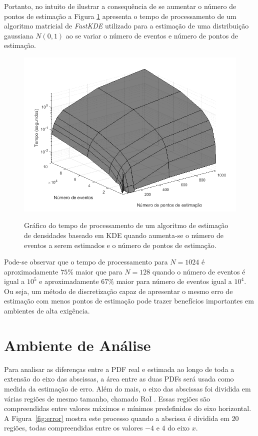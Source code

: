 Portanto, no intuito de ilustrar a consequência de se aumentar o número de pontos de estimação a Figura \ref{fig:compKDE} apresenta o tempo de processamento de um algoritmo matricial de \textit{FastKDE} utilizado para a estimação de uma distribuição gaussiana $N(0,1)$ ao se variar o número de eventos e número de pontos de estimação.

\begin{figure}[!ht]
	\centering
	\includegraphics[width=0.8\linewidth]{./figuras/custocomp.png}\\
	\caption{Gráfico do tempo de processamento de um algoritmo de estimação de densidades baseado em KDE quando aumenta-se o número de eventos a serem estimados e o número de pontos de estimação.}
	\label{fig:compKDE}
\end{figure}

Pode-se observar que o tempo de processamento para $N = 1024$ é aproximadamente $75\%$ maior que para $N = 128$ quando o número de eventos é igual a $10^5$ e aproximadamente $67\%$ maior para número de eventos igual a $10^4$. Ou seja, um método de discretização capaz de apresentar o mesmo erro de estimação com menos pontos de estimação pode trazer benefícios importantes em ambientes de alta exigência.


\section{Ambiente de Análise}

Para analisar as diferenças entre a \ac{PDF} real e estimada ao longo de toda a extensão do eixo das abscissas, a área entre as duas \ac{PDF}s será usada como medida da estimação de erro. Além do mais, o eixo das abscissas foi dividida em várias regiões de mesmo tamanho, chamado \ac{RoI} \cite{ron1999art}. Essas regiões são compreendidas entre valores máximos e mínimos predefinidos do eixo horizontal. A Figura~\ref{fig:error} mostra este processo quando a abscissa é dividida em 20 regiões, todas compreendidas entre os valores $-4$ e $4$ do eixo $ x $.


